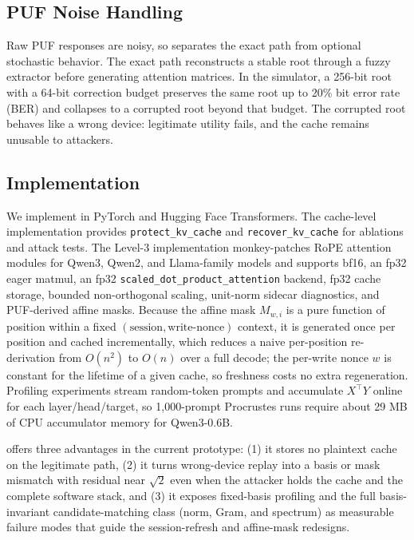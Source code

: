 \subsection{PUF Noise Handling}

Raw PUF responses are noisy, so \sys{} separates the exact path from optional stochastic behavior. The exact path reconstructs a stable root through a fuzzy extractor before generating attention matrices. In the simulator, a 256-bit root with a 64-bit correction budget preserves the same root up to 20\% bit error rate (BER) and collapses to a corrupted root beyond that budget. The corrupted root behaves like a wrong device: legitimate utility fails, and the cache remains unusable to attackers.

\subsection{Implementation}

We implement \sys{} in PyTorch and Hugging Face Transformers. The cache-level implementation provides \texttt{protect\_kv\_cache} and \texttt{recover\_kv\_cache} for ablations and attack tests. The Level-3 implementation monkey-patches RoPE attention modules for Qwen3, Qwen2, and Llama-family models and supports bf16, an fp32 eager matmul, an fp32 \texttt{scaled\_dot\_product\_attention} backend, fp32 cache storage, bounded non-orthogonal scaling, unit-norm sidecar diagnostics, and PUF-derived affine masks. Because the affine mask $M_{w,i}$ is a pure function of position within a fixed $(\text{session},\text{write-nonce})$ context, it is generated once per position and cached incrementally, which reduces a naive per-position re-derivation from $O(n^2)$ to $O(n)$ over a full decode; the per-write nonce $w$ is constant for the lifetime of a given cache, so freshness costs no extra regeneration. Profiling experiments stream random-token prompts and accumulate $X^\top Y$ online for each layer/head/target, so 1,000-prompt Procrustes runs require about 29 MB of CPU accumulator memory for Qwen3-0.6B.

\sys{} offers three advantages in the current prototype: (1) it stores no plaintext cache on the legitimate path, (2) it turns wrong-device replay into a basis or mask mismatch with residual near $\sqrt{2}$ even when the attacker holds the cache and the complete software stack, and (3) it exposes fixed-basis profiling and the full basis-invariant candidate-matching class (norm, Gram, and spectrum) as measurable failure modes that guide the session-refresh and affine-mask redesigns.
